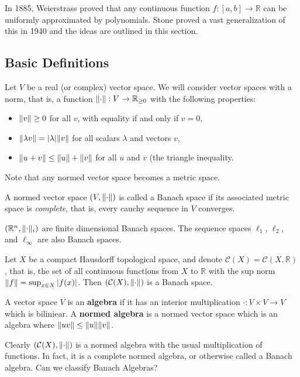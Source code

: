 In 1885, Weierstrass proved that any continuous function $f:[a, b] \to \mathbb{R}$ can be uniformly approximated by polynomials. Stone proved a vast generalization of this in 1940 and the ideas are outlined in this section.

\subsection{Basic Definitions}

Let $V$ be a real (or complex) vector space. We will consider vector spaces with a norm, that is, a function $\lVert\cdot\rVert: V \to \mathbb{R}_{\geq 0}$ with the following properties:
\begin{itemize}
	\item $\lVert v\rVert \geq 0$ for all $v$, with equality if and only if $v = 0$,
	\item $\lVert\lambda v\rVert = |\lambda| \lVert v\rVert$ for all scalars $\lambda$ and vectors $v$,
	\item $\lVert u + v\rVert \leq \lVert u\rVert + \lVert v\rVert$ for all $u$ and $v$ (the triangle inequality.
\end{itemize}

Note that any normed vector space becomes a metric space.

\begin{definition}
A normed vector space $(V, \lVert\cdot\rVert)$ is called a Banach space if its associated metric space is \textit{complete}, that is, every cauchy sequence in $V$ converges.
\end{definition}

\begin{example}
$(\mathbb{R}^n, \lVert\cdot\rVert_i)$ are finite dimensional Banach spaces. The sequence spaces $\ell_1$, $\ell_2$, and $\ell_{\infty}$ are also Banach spaces.
\end{example}

\begin{example}
Let $X$ be a compact Hausdorff topological space, and denote $\mathcal{C}(X) = \mathcal{C}(X, \mathbb{R})$, that is, the set of all continuous functions from $X$ to $\mathbb{R}$ with the sup norm $\lVert f\rVert = \sup_{x \in X}|f(x)|$. Then $(\mathcal{C}(X), \lVert\cdot\rVert)$ is a Banach space.
\end{example}

\begin{definition}
A vector space $V$ is an \textbf{algebra} if it has an interior multiplication $\cdot: V \times V \to V$ which is biliniear. A \textbf{normed algebra} is a normed vector space which is an algebra where $\lVert uv\rVert \leq \lVert u\rVert\lVert v\rVert$. 
\end{definition}

Clearly $(\mathcal{C}(X), \lVert\cdot\rVert)$ is a normed algebra with the usual multiplication of functions. In fact, it is a complete normed algebra, or otherwise called a Banach algebra. Can we classify Banach Algebras?

